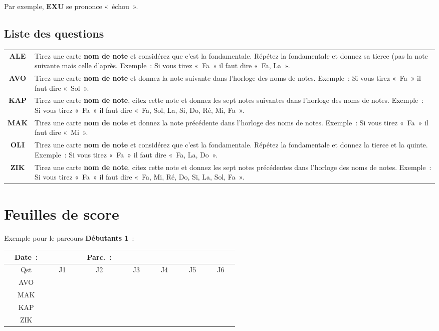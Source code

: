 \documentclass[11pt]{article}
\newcommand{\carte}[1]
{\textbf{#1}}
\newcommand{\parcours}[1]
{\textbf{#1}}
\newcommand{\QST}[1]
{\textbf{#1}}
\begin{document}
Par exemple, \QST{EXU} se prononce « échou ».

\subsection{Liste des questions} \label{liste questions}

\begin{tabular}{ c p{12cm} }
    \QST{ALE} & Tirez une carte \carte{nom de note} et considérez que c’est la
                fondamentale. Répétez la fondamentale et donnez sa tierce (pas
                la note suivante mais celle d’après. Exemple : Si vous tirez
                « Fa » il faut dire « Fa, La ». \\
    \QST{AVO} & Tirez une carte \carte{nom de note} et donnez la note suivante
                dans l’horloge des noms de notes. Exemple : Si vous tirez
                « Fa » il faut dire « Sol ». \\
    \QST{KAP} & Tirez une carte \carte{nom de note}, citez cette note et donnez
                les sept notes suivantes dans l’horloge des noms de notes.
                Exemple : Si vous tirez « Fa » il faut dire « Fa, Sol, La, Si,
                Do, Ré, Mi, Fa ». \\
    \QST{MAK} & Tirez une carte \carte{nom de note} et donnez la note
                précédente dans l’horloge des noms de notes. Exemple : Si vous
                tirez « Fa » il faut dire « Mi ». \\
    \QST{OLI} & Tirez une carte \carte{nom de note} et considérez que c’est la
                fondamentale. Répétez la fondamentale et donnez la tierce et
                la quinte. Exemple : Si vous tirez « Fa » il faut dire « Fa,
                La, Do ». \\
    \QST{ZIK} & Tirez une carte \carte{nom de note}, citez cette note et donnez
                les sept notes précédentes dans l’horloge des noms de notes.
                Exemple : Si vous tirez « Fa » il faut dire « Fa, Mi, Ré, Do,
                Si, La, Sol, Fa ».
\end{tabular}

\newpage

\section{Feuilles de score}

Exemple pour le parcours \parcours{Débutants 1} :

\begin{tabular}{ | *{7}{p{0.1cm}cp{0.1cm} |} }
    \hline
    & Date : &&&&&& Parc. : \\
    \hline
    & Qst &&& J1 &&& J2 &&& J3 &&& J4 &&& J5 &&& J6 & \\
    \hline
    & AVO &&&&&&&&&&&&&&&&&&& \\
    \hline
    & MAK &&&&&&&&&&&&&&&&&&& \\
    \hline
    & KAP &&&&&&&&&&&&&&&&&&& \\
    \hline
    & ZIK &&&&&&&&&&&&&&&&&&& \\
    \hline
\end{tabular}
\end{document}
